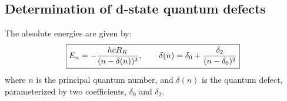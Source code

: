 \documentclass[landscape]{sciposter}
\begin{document}
\begin{multicols}{4}
\section*{\large Determination of d-state quantum defects}
The absolute energies are given by:
\begin{align*}
\boxed{E_n = -\frac{hcR_K}{(n - \delta(n))^2}, \hspace{0.7cm} \delta(n) = \delta_0 + \frac{\delta_2}{(n-\delta_0)^2}}
\end{align*}
where $n$ is the principal quantum number, and $\delta(n)$ is the quantum defect, parameterized by two coefficients, $\delta_0$ and $\delta_2$.



\end{multicols}
\end{document}
